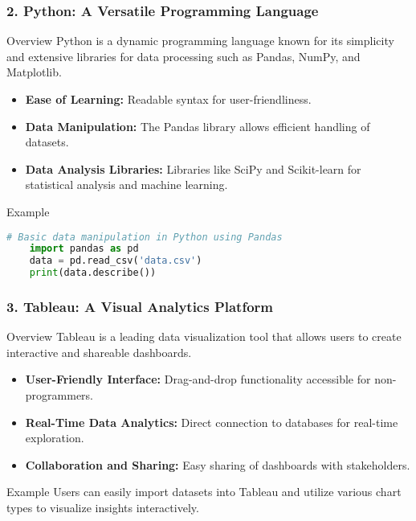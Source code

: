 \documentclass[aspectratio=169]{beamer}
\begin{document}
\begin{frame}[fragile]
    \frametitle{2. Python: A Versatile Programming Language}
    
    \begin{block}{Overview}
        Python is a dynamic programming language known for its simplicity and extensive libraries for data processing such as Pandas, NumPy, and Matplotlib.
    \end{block}
    
    \begin{itemize}
        \item \textbf{Ease of Learning:} Readable syntax for user-friendliness.
        \item \textbf{Data Manipulation:} The Pandas library allows efficient handling of datasets.
        \item \textbf{Data Analysis Libraries:} Libraries like SciPy and Scikit-learn for statistical analysis and machine learning.
    \end{itemize}
    
    \begin{block}{Example}
    \begin{lstlisting}[language=Python]
    # Basic data manipulation in Python using Pandas
    import pandas as pd
    data = pd.read_csv('data.csv')
    print(data.describe())
    \end{lstlisting}
    \end{block}
\end{frame}

\begin{frame}
    \frametitle{3. Tableau: A Visual Analytics Platform}
    
    \begin{block}{Overview}
        Tableau is a leading data visualization tool that allows users to create interactive and shareable dashboards.
    \end{block}
    
    \begin{itemize}
        \item \textbf{User-Friendly Interface:} Drag-and-drop functionality accessible for non-programmers.
        \item \textbf{Real-Time Data Analytics:} Direct connection to databases for real-time exploration.
        \item \textbf{Collaboration and Sharing:} Easy sharing of dashboards with stakeholders.
    \end{itemize}

    \begin{block}{Example}
        Users can easily import datasets into Tableau and utilize various chart types to visualize insights interactively.
    \end{block}
\end{frame}
\end{document}
